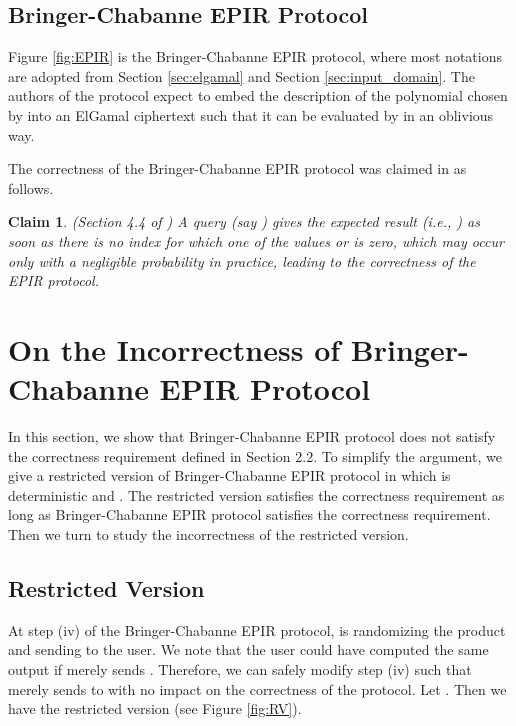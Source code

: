\documentclass[JMC]{degruyter-journal}
\newtheorem{claim}{Claim}[section]
\begin{document}
\subsection{Bringer-Chabanne EPIR Protocol  }


Figure \ref{fig:EPIR} is the Bringer-Chabanne EPIR protocol, where  most notations are adopted from
 Section \ref{sec:elgamal} and Section \ref{sec:input_domain}.
The authors of the protocol expect to embed the description of the
polynomial  chosen by  into an ElGamal
ciphertext such that it can be evaluated by  in an
oblivious way.

\newpage

The correctness of the Bringer-Chabanne EPIR protocol was claimed in \cite{BC09} as follows.
\begin{claim}\label{clm:correctness}
{\em (Section 4.4 of \cite{BC09})} A query {\em (say )} gives the expected result
 {\em (i.e., )} as soon as there is no index  for which one
of the values  or  is zero, which may occur only
with a negligible probability in practice, leading to the
correctness of the EPIR protocol.
\end{claim}










\section{On the Incorrectness of Bringer-Chabanne EPIR Protocol}

In this section, we show that Bringer-Chabanne EPIR protocol does not satisfy the
correctness requirement defined in Section 2.2.   To simplify the
argument, we  give a  restricted version of Bringer-Chabanne EPIR protocol in which
 is deterministic and  . The restricted version
satisfies the correctness requirement as long as  Bringer-Chabanne EPIR protocol
 satisfies the correctness requirement. Then we turn to study  the incorrectness of the restricted version.






\subsection{Restricted Version}
At step (iv) of  the Bringer-Chabanne EPIR protocol,  is
randomizing the product   and sending
  to the user.
We  note that the user could have computed the same output if  merely
 sends  .
Therefore, we can safely modify step (iv) such that 
merely sends    to 
 with no impact on the correctness of the protocol. Let .
  Then we have the restricted version (see Figure \ref{fig:RV}).
\end{document}
